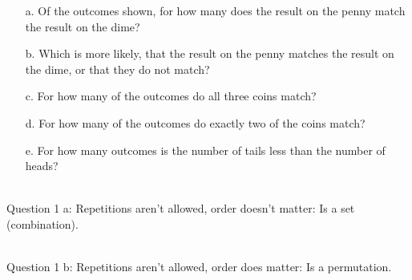 {\begin{questionNOGRADE}{\thequestion}
\begin{center}
        \end{center}

        \begin{enumerate}
                \item[a.]   Of the outcomes shown, for how many does
                            the result on the penny match the result on the dime?

                \item[b.]   Which is more likely, that the result on the penny
                            matches the result on the dime, or that they do not match?

                \item[c.]   For how many of the outcomes do all three coins match?

                \item[d.]   For how many of the outcomes do exactly two of the coins match?

                \item[e.]   For how many outcomes is the number of tails less than the number of heads?
        \end{enumerate}
        
    \end{questionNOGRADE}

}{
    ~\\ Question 1 a:   Repetitions aren't allowed, order doesn't matter: Is a set (combination).

    ~\\ Question 1 b:   Repetitions aren't allowed, order does matter: Is a permutation.

}
